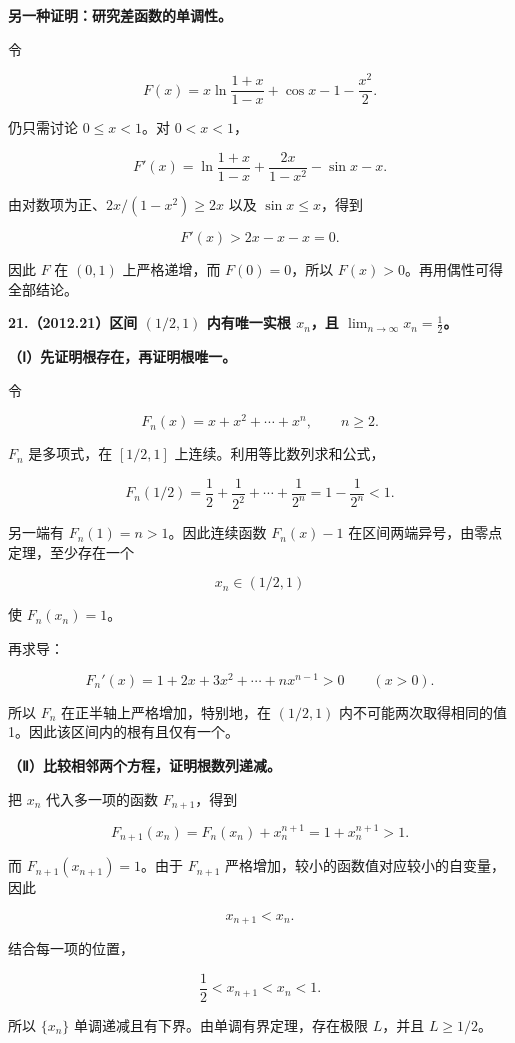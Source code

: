 \documentclass[UTF8,11pt,fontset=windows]{ctexart}
\begin{document}
\textbf{另一种证明：研究差函数的单调性。}

令

$$
F(x)=x\ln\frac{1+x}{1-x}+\cos x-1-\frac{x^2}{2}.
$$

仍只需讨论 $0\le x<1$。对 $0<x<1$，

$$
F'(x)=\ln\frac{1+x}{1-x}+\frac{2x}{1-x^2}-\sin x-x.
$$

由对数项为正、$2x/(1-x^2)\ge2x$ 以及 $\sin x\le x$，得到

$$
F'(x)>2x-x-x=0.
$$

因此 $F$ 在 $(0,1)$ 上严格递增，而 $F(0)=0$，所以 $F(x)>0$。再用偶性可得全部结论。

\clearpage

\textbf{21.（2012.21）区间 $(1/2,1)$ 内有唯一实根 $x_n$，且 $\displaystyle\lim_{n\to\infty}x_n=\frac12$。}

\textbf{（Ⅰ）先证明根存在，再证明根唯一。}

令

$$
F_n(x)=x+x^2+\cdots+x^n,
\qquad n\ge2.
$$

$F_n$ 是多项式，在 $[1/2,1]$ 上连续。利用等比数列求和公式，

$$
F_n(1/2)=\frac12+\frac1{2^2}+\cdots+\frac1{2^n}
=1-\frac1{2^n}<1.
$$

另一端有 $F_n(1)=n>1$。因此连续函数 $F_n(x)-1$ 在区间两端异号，由零点定理，至少存在一个

$$
x_n\in(1/2,1)
$$

使 $F_n(x_n)=1$。

再求导：

$$
F_n'(x)=1+2x+3x^2+\cdots+nx^{n-1}>0
\qquad(x>0).
$$

所以 $F_n$ 在正半轴上严格增加，特别地，在 $(1/2,1)$ 内不可能两次取得相同的值1。因此该区间内的根有且仅有一个。

\textbf{（Ⅱ）比较相邻两个方程，证明根数列递减。}

把 $x_n$ 代入多一项的函数 $F_{n+1}$，得到

$$
F_{n+1}(x_n)
=F_n(x_n)+x_n^{n+1}
=1+x_n^{n+1}>1.
$$

而 $F_{n+1}(x_{n+1})=1$。由于 $F_{n+1}$ 严格增加，较小的函数值对应较小的自变量，因此

$$
x_{n+1}<x_n.
$$

结合每一项的位置，

$$
\frac12<x_{n+1}<x_n<1.
$$

所以 $\{x_n\}$ 单调递减且有下界。由单调有界定理，存在极限 $L$，并且 $L\ge1/2$。
\end{document}
